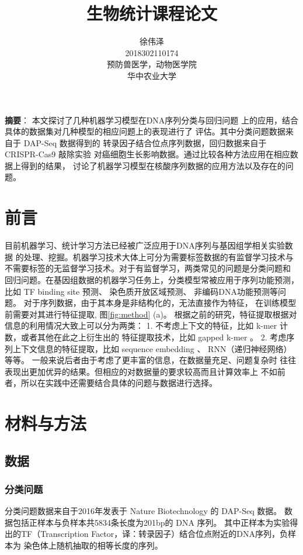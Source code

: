 \documentclass[UTF8]{ctexart}
\title{生物统计课程论文}
\author{徐伟泽\\2018302110174\\预防兽医学，动物医学院\\华中农业大学}
\begin{document}
  \maketitle

  \textbf{摘要}：
  本文探讨了几种机器学习模型在DNA序列分类与回归问题
  上的应用，结合具体的数据集对几种模型的相应问题上的表现进行了
  评估。其中分类问题数据来自于 DAP-Seq 数据得到的
  转录因子结合位点序列数据，回归数据来自于 CRISPR-Cas9 敲除实验
  对癌细胞生长影响数据。通过比较各种方法应用在相应数据上得到的结果，
  讨论了机器学习模型在核酸序列数据的应用方法以及存在的问题。

  \section{前言}
  目前机器学习、统计学习方法已经被广泛应用于DNA序列与基因组学相关实验数据
  的处理、挖掘。机器学习技术大体上可分为需要标签数据的有监督学习技术与
  不需要标签的无监督学习技术。对于有监督学习，两类常见的问题是分类问题和
  回归问题。在基因组数据的机器学习任务上，分类模型常被应用于序列功能预测，
  比如 TF binding site 预测\autocite{ghandi2014enhanced,alipanahi2015predicting}、
  染色质开放区域预测\autocite{kelley2016basset}、
  非编码DNA功能预测\autocite{zhou2015predicting}等问题。
  对于序列数据，由于其本身是非结构化的，无法直接作为特征，
  在训练模型前需要对其进行特征提取, 图\ref{fig:method} (a)。
  根据之前的研究，特征提取根据对信息的利用情况大致上可以分为两类：
  1. 不考虑上下文的特征，比如 k-mer 计数，或者其他在此之上衍生出的
  特征提取技术，比如 gapped k-mer \autocite{ghandi2014enhanced}。
  2. 考虑序列上下文信息的特征提取，比如 sequence embedding \autocite{zeng2018prediction}、
  RNN（递归神经网络）\autocite{shen2018recurrent} 等等。
  一般来说后者由于考虑了更丰富的信息，在数据量充足、问题复杂时
  往往表现出更加优异的结果。但相应的对数据量的要求较高而且计算效率上
  不如前者，所以在实践中还需要结合具体的问题与数据进行选择。

  \section{材料与方法}
  \subsection{数据}
  \subsubsection{分类问题}
  分类问题数据来自于2016年发表于 Nature Biotechnology 的 DAP-Seq 数据\autocite{o2016cistrome}。
  数据包括正样本与负样本共5834条长度为201bp的 DNA 序列。
  其中正样本为实验得出的TF（Transcription Factor，译：转录因子）结合位点附近的DNA序列，负样本为
  染色体上随机抽取的相等长度的序列。
\end{document}
